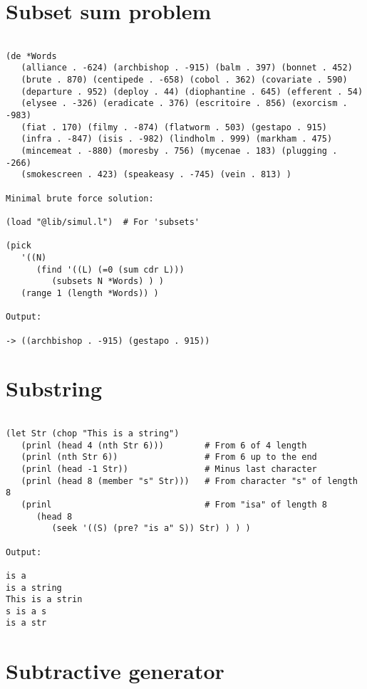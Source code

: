 \section*{Subset sum problem}

\begin{verbatim}

(de *Words
   (alliance . -624) (archbishop . -915) (balm . 397) (bonnet . 452)
   (brute . 870) (centipede . -658) (cobol . 362) (covariate . 590)
   (departure . 952) (deploy . 44) (diophantine . 645) (efferent . 54)
   (elysee . -326) (eradicate . 376) (escritoire . 856) (exorcism . -983)
   (fiat . 170) (filmy . -874) (flatworm . 503) (gestapo . 915)
   (infra . -847) (isis . -982) (lindholm . 999) (markham . 475)
   (mincemeat . -880) (moresby . 756) (mycenae . 183) (plugging . -266)
   (smokescreen . 423) (speakeasy . -745) (vein . 813) )

Minimal brute force solution:

(load "@lib/simul.l")  # For 'subsets'

(pick
   '((N)
      (find '((L) (=0 (sum cdr L)))
         (subsets N *Words) ) )
   (range 1 (length *Words)) )

Output:

-> ((archbishop . -915) (gestapo . 915))

\end{verbatim}

\section*{Substring}

\begin{verbatim}

(let Str (chop "This is a string")
   (prinl (head 4 (nth Str 6)))        # From 6 of 4 length
   (prinl (nth Str 6))                 # From 6 up to the end
   (prinl (head -1 Str))               # Minus last character
   (prinl (head 8 (member "s" Str)))   # From character "s" of length 8
   (prinl                              # From "isa" of length 8
      (head 8
         (seek '((S) (pre? "is a" S)) Str) ) ) )

Output:

is a
is a string
This is a strin
s is a s
is a str

\end{verbatim}

\section*{Subtractive generator}


